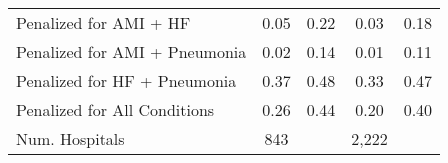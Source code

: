 \begin{table}[ht!]
\begin{tabular}[t]{lcccc}
\hspace{1em}Penalized for AMI + HF & 0.05 & 0.22 & 0.03 & 0.18\\
\hspace{1em}Penalized for AMI + Pneumonia & 0.02 & 0.14 & 0.01 & 0.11\\
\hspace{1em}Penalized for HF + Pneumonia & 0.37 & 0.48 & 0.33 & 0.47\\
\hspace{1em}Penalized for All Conditions & 0.26 & 0.44 & 0.20 & 0.40\\
\addlinespace[0.3em]
Num. Hospitals & 843 &  & 2,222 & \\
\bottomrule
\end{tabular}
\end{table}
